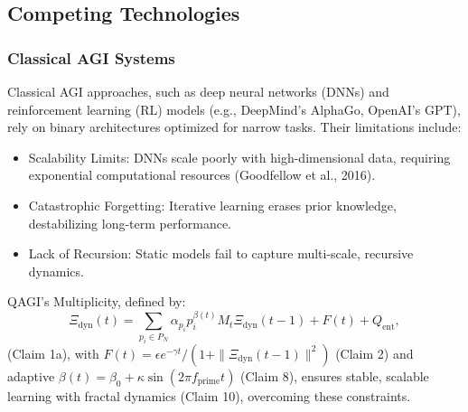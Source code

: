 \documentclass{article}
\theoremstyle{plain}
\theoremstyle{claimstyle}
\begin{document}
\subsection{Competing Technologies}

\subsubsection{Classical AGI Systems}
Classical AGI approaches, such as deep neural networks (DNNs) and reinforcement learning (RL) models (e.g., DeepMind’s AlphaGo, OpenAI’s GPT), rely on binary architectures optimized for narrow tasks. Their limitations include:
\begin{itemize}
    \item Scalability Limits: DNNs scale poorly with high-dimensional data, requiring exponential computational resources (Goodfellow et al., 2016).
    \item Catastrophic Forgetting: Iterative learning erases prior knowledge, destabilizing long-term performance.
    \item Lack of Recursion: Static models fail to capture multi-scale, recursive dynamics.
\end{itemize}
QAGI’s Multiplicity, defined by:
\begin{equation}
\Xi_{\text{dyn}}(t) = \sum_{p_i \in P_N} \alpha_{p_i} p_i^{\beta(t)} M_t \Xi_{\text{dyn}}(t-1) + F(t) + Q_{\text{ent}},
\end{equation}
(Claim 1a), with \( F(t) = \epsilon e^{-\gamma t} / (1 + \|\Xi_{\text{dyn}}(t-1)\|^2) \) (Claim 2) and adaptive \( \beta(t) = \beta_0 + \kappa \sin(2\pi f_{\text{prime}} t) \) (Claim 8), ensures stable, scalable learning with fractal dynamics (Claim 10), overcoming these constraints.
\end{document}
